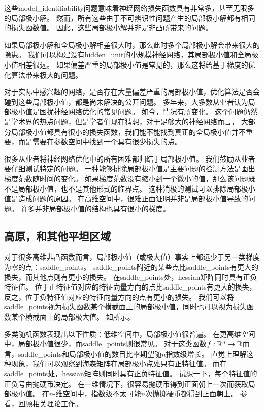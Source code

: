 这些\gls{model_identifiability}问题意味着神经网络损失函数具有非常多，甚至无限多的局部极小解。
然而，所有这些由于不可辨识性问题产生的局部极小解都有相同的损失函数值。
因此，这些局部极小解并非是非凸所带来的问题。

如果局部极小解和全局极小解相差很大时，那么此时多个局部极小解会带来很大的隐患。
我们可以构建没有\gls{hidden_unit}的小规模神经网络，其局部极小值和全局极小值相差很远\citep{Sontag-cs89,Brady89,Gori-pami91}。
如果偏差严重的局部极小值是常见的，那么这将给基于梯度的优化算法带来极大的问题。


对于实际中感兴趣的网络，是否存在大量偏差严重的局部极小值，优化算法是否会碰到这些局部极小值，都是尚未解决的公开问题。
多年来，大多数从业者认为局部极小值是困扰神经网络优化的常见问题。
如今，情况有所变化。
这个问题仍然是学术界的热点问题，但是学者们现在猜想，对于足够大的神经网络而言，
大部分局部极小值都具有很小的损失函数，我们能不能找到真正的全局极小值并不重要，而是需要在参数空间中找到一个具有很少损失的点\citep{Saxe-et-al-ICLR13,Dauphin-et-al-NIPS2014-small,GoodfellowOptimization15,Choromanska-et-al-AISTATS2015}。

很多从业者将神经网络优化中的所有困难都归结于局部极小值。
我们鼓励从业者要仔细测试特定的问题。
一种能够排除局部极小值是主要问题的检测方法是画出梯度范数随时间的变化。
如果梯度范数没有缩小到一个微小的值，那么该问题既不是局部极小值，也不是其他形式的临界点。
这种消极的测试可以排除局部极小值是造成问题的原因。
在高维空间中，很难正面证明并非是局部极小值导致的问题。
许多并非局部极小值的结构也具有很小的梯度。

\subsection{高原，和其他平坦区域}
\label{sec:plateaus_saddle_points_and_other_flat_regions}
对于很多高维非凸函数而言，局部极小值（或极大值）事实上都远少于另一类梯度为零的点：\gls{saddle_points}。
\gls{saddle_points}附近的某些点比\gls{saddle_points}有更大的损失，而其他点则有更小的损失。
在\gls{saddle_points}处，\gls{hessian}矩阵同时具有正负特征值。
位于正特征值对应的特征向量方向的点比\gls{saddle_points}有更大的损失，反之，位于负特征值对应的特征向量方向的点有更小的损失。
我们可以将\gls{saddle_points}视为损失函数某个横截面上的局部极小值，同时也可以视为损失函数某个横截面上的局部极大值。
如所示。

多类随机函数表现出以下性质：低维空间中，局部极小值很普遍。
在更高维空间中，局部极小值很少，而\gls{saddle_points}则很常见。
对于这类函数$f:\mathbb{R}^n \to \mathbb{R}$而言，\gls{saddle_points}和局部极小值的数目比率期望随$n$指数级增长。
直觉上理解这种现象，我们可以观察到海森矩阵在局部极小点处只有正特征值。
而在\gls{saddle_points}处，\gls{hessian}矩阵则同时具有正负特征值。
试想一下，每个特征值的正负号由抛硬币决定。
在一维情况下，很容易抛硬币得到正面朝上一次而获取局部极小值。
在$n$-维空间中，指数级不太可能$n$次抛掷硬币都得到正面朝上。
参看\cite{Dauphin-et-al-NIPS2014-small}，回顾相关理论工作。

